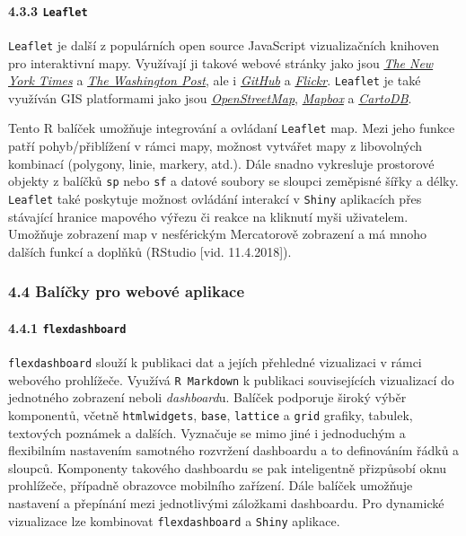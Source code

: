 \documentclass[12pt,]{article}
\let\oldparagraph\paragraph
\renewcommand{\paragraph}[1]{\oldparagraph{#1}\mbox{}}
\begin{document}
\hypertarget{leaflet}{\paragraph{\texorpdfstring{4.3.3
\texttt{Leaflet}}{4.3.3 Leaflet}}\label{leaflet}}

\qquad \texttt{Leaflet} je další z populárních open source JavaScript
vizualizačních knihoven pro interaktivní mapy. Využívají ji takové
webové stránky jako jsou
\href{http://www.nytimes.com/projects/elections/2013/nyc-primary/mayor/map.html}{\emph{The
New York Times}} a
\href{http://www.washingtonpost.com/sf/local/2013/11/09/washington-a-world-apart/?utm_term=.906188040dc1}{\emph{The
Washington Post}}, ale i
\href{https://blog.github.com/2013-06-13-there-s-a-map-for-that/}{\emph{GitHub}}
a \href{https://www.flickr.com/map}{\emph{Flickr}}. \texttt{Leaflet} je
také využíván GIS platformami jako jsou
\href{http://www.openstreetmap.org/\#map=7/49.714/15.060}{\emph{OpenStreetMap}},
\href{https://www.mapbox.com/}{\emph{Mapbox}} a
\href{https://carto.com/}{\emph{CartoDB}}.

\qquad Tento R balíček umožňuje integrování a ovládaní \texttt{Leaflet}
map. Mezi jeho funkce patří pohyb/přiblížení v rámci mapy, možnost
vytvářet mapy z libovolných kombinací (polygony, linie, markery, atd.).
Dále snadno vykresluje prostorové objekty z balíčků \texttt{sp} nebo
\texttt{sf} a datové soubory se sloupci zeměpisné šířky a délky.
\texttt{Leaflet} také poskytuje možnost ovládání interakcí v
\texttt{Shiny} aplikacích přes stávající hranice mapového výřezu či
reakce na kliknutí myši uživatelem. Umožňuje zobrazení map v nesférickým
Mercatorově zobrazení a má mnoho dalších funkcí a doplňků (RStudio
{[}vid. 11.4.2018{]}).

\hypertarget{webviz}{\subsubsection{4.4 Balíčky pro webové
aplikace}\label{webviz}}

\paragraph{\texorpdfstring{4.4.1
\texttt{flexdashboard}}{4.4.1 flexdashboard}}\label{flexdashboard}

\qquad \texttt{flexdashboard} slouží k publikaci dat a jejích přehledné
vizualizaci v rámci webového prohlížeče. Využívá \texttt{R\ Markdown} k
publikaci souvisejících vizualizací do jednotného zobrazení neboli
\emph{dashboard}u. Balíček podporuje široký výběr komponentů, včetně
\texttt{htmlwidgets}, \texttt{base}, \texttt{lattice} a \texttt{grid}
grafiky, tabulek, textových poznámek a dalších. Vyznačuje se mimo jiné i
jednoduchým a flexibilním nastavením samotného rozvržení dashboardu a to
definováním řádků a sloupců. Komponenty takového dashboardu se pak
inteligentně přizpůsobí oknu prohlížeče, případně obrazovce mobilního
zařízení. Dále balíček umožňuje nastavení a přepínání mezi jednotlivými
záložkami dashboardu. Pro dynamické vizualizace lze kombinovat
\texttt{flexdashboard} a \texttt{Shiny} aplikace.
\end{document}
